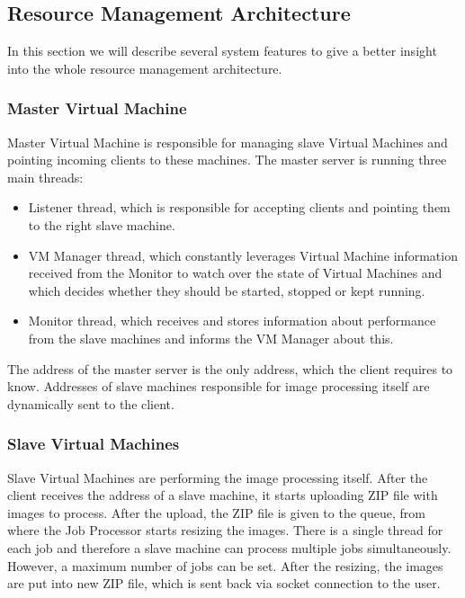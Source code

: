 \subsection{Resource Management Architecture}

In this section we will describe several system features to give a better insight into the whole resource management architecture.

\subsubsection{Master Virtual Machine}
Master Virtual Machine is responsible for managing slave Virtual Machines and pointing incoming clients to these machines. The master server is running three main threads:
\begin{itemize}
 \item Listener thread, which is responsible for accepting clients and pointing them to the right slave machine.
 \item VM Manager thread, which constantly leverages Virtual Machine information received from the Monitor to watch over the state of Virtual Machines and which decides whether they should be started, stopped or kept running.
 \item Monitor thread, which receives and stores information about performance from the slave machines and informs the VM Manager about this.
\end{itemize}

The address of the master server is the only address, which the client requires to know. Addresses of slave machines responsible for image processing itself are dynamically sent to the client.

\subsubsection{Slave Virtual Machines}
Slave Virtual Machines are performing the image processing itself. After the client receives the address of a slave machine, it starts uploading ZIP file with images to process. After the upload, the ZIP file is given to the queue, from where the Job Processor starts resizing the images. There is a single thread for each job and therefore a slave machine can process multiple jobs simultaneously. However, a maximum number of jobs can be set. %
After the resizing, the images are put into new ZIP file, which is sent back via socket connection to the user.

